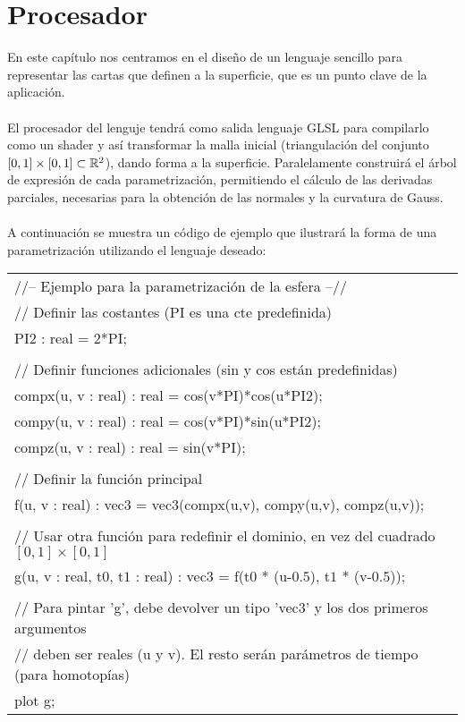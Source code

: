 
\chapter{Procesador}

En este capítulo nos centramos en el diseño de un lenguaje sencillo para representar las cartas que definen a la superficie, que es un punto clave de la aplicación.\\
\\El procesador del lenguje tendrá como salida lenguaje GLSL para compilarlo como un shader y así transformar la malla inicial (triangulación del conjunto $[0,1]\times[0,1] \subset \mathbb{R}^2$), dando forma a la superficie. Paralelamente construirá el árbol de expresión de cada parametrización, permitiendo el cálculo de las derivadas parciales, necesarias para la obtención de las normales y la curvatura de Gauss.\\
\\A continuación se muestra un código de ejemplo que ilustrará la forma de una parametrización utilizando el lenguaje deseado:

\begin{center}
\begin{tabular}{| p{14cm} |}
\hline
//-- Ejemplo para la parametrización de la esfera --//\\
// Definir las costantes (PI es una cte predefinida)\\
PI$2$ : real = $2$*PI;\\
\\
// Definir funciones adicionales (sin y cos están predefinidas)\\
compx(u, v : real) : real = cos(v*PI)*cos(u*PI$2$);\\
compy(u, v : real) : real = cos(v*PI)*sin(u*PI$2$);\\
compz(u, v : real) : real = sin(v*PI);\\
\\
// Definir la función principal\\
f(u, v : real) : vec$3$ = vec$3$(compx(u,v), compy(u,v), compz(u,v));\\
\\
// Usar otra función para redefinir el dominio, en vez del cuadrado $[0,1]\times[0,1]$\\
g(u, v : real, t$0$, t$1$ : real) : vec$3$ = f(t$0$ * (u-$0.5$), t$1$ * (v-$0.5$));\\
\\
//  Para pintar 'g', debe devolver un tipo 'vec$3$' y los dos primeros argumentos \\
// deben ser reales (u y v). El resto serán parámetros de tiempo (para homotopías)\\
plot g;\\
\hline
\end{tabular}
\end{center}


